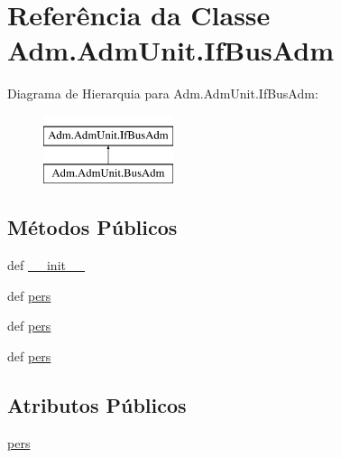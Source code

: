 \hypertarget{classAdm_1_1AdmUnit_1_1IfBusAdm}{\section{Referência da Classe Adm.\-Adm\-Unit.\-If\-Bus\-Adm}
\label{d3/d53/classAdm_1_1AdmUnit_1_1IfBusAdm}
}
Diagrama de Hierarquia para Adm.\-Adm\-Unit.\-If\-Bus\-Adm\-:\begin{figure}[H]
\begin{center}
\leavevmode
\includegraphics[height=2.000000cm]{d3/d53/classAdm_1_1AdmUnit_1_1IfBusAdm}
\end{center}
\end{figure}
\subsection*{Métodos Públicos}
\begin{DoxyCompactItemize}
\item 
def \hyperlink{classAdm_1_1AdmUnit_1_1IfBusAdm_abe924f0f983b1fe97ca466907d35c834}{\-\_\-\-\_\-init\-\_\-\-\_\-}
\item 
def \hyperlink{classAdm_1_1AdmUnit_1_1IfBusAdm_a31857b146085382c8d778ae90cd46c6f}{pers}
\item 
def \hyperlink{classAdm_1_1AdmUnit_1_1IfBusAdm_a31857b146085382c8d778ae90cd46c6f}{pers}
\item 
def \hyperlink{classAdm_1_1AdmUnit_1_1IfBusAdm_a31857b146085382c8d778ae90cd46c6f}{pers}
\end{DoxyCompactItemize}
\subsection*{Atributos Públicos}
\begin{DoxyCompactItemize}
\item 
\hyperlink{classAdm_1_1AdmUnit_1_1IfBusAdm_a95ea8f39fbbcddf44822e1614c712bfe}{pers}
\end{DoxyCompactItemize}


